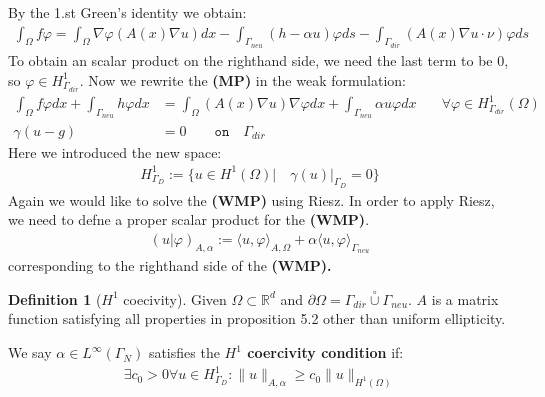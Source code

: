 \documentclass[a4paper,11pt,oneside,fleqn]{book}
\theoremstyle{definition}
\newtheorem{definition}{Definition}[section]
\theoremstyle{remark}
\begin{document}
By the 1.st Green's identity we obtain:
\begin{align*}
	\int_\Omega f\varphi = \int_\Omega \nabla \varphi( A(x)\nabla u )dx - \int_{\Gamma_{neu}} (h - \alpha u)\varphi ds - 
	\int_{\Gamma_{dir}} (A(x)\nabla u \cdot \nu)\varphi ds 
\end{align*}
To obtain an scalar product on the righthand side, we need the last term to be 0, so $\varphi \in H^1_{\Gamma_{dir}}$. Now we rewrite the \textbf{(MP)} in the weak formulation: 
\begin{equation}
\begin{aligned}
	\int_{\Omega}f\varphi dx + \int_{\Gamma_{neu}} h\varphi dx &= \int_\Omega(A(x) \nabla u)\nabla\varphi dx + \int_{\Gamma_{neu}} \alpha u \varphi dx
	\quad &\forall \varphi \in H^1_{\Gamma_{dir}}(\Omega)\\
	\gamma(u - g) &= 0 \qquad  \texttt{on} \quad \Gamma_{dir}
\end{aligned}
\end{equation}
Here we introduced the new space:
\begin{align*}
	H^1_{\Gamma_D}:= \{u \in H^1(\Omega) |\quad \gamma(u)|_{\Gamma_D} = 0\}
\end{align*}
Again we would like to solve the \textbf{(WMP) }using Riesz. In order to apply Riesz, we need to defne a proper scalar product for the \textbf{(WMP)}.
\begin{align*}
	( u| \varphi )_{A, \alpha}:= \langle u, \varphi \rangle_{A, \Omega} + \alpha \langle u, \varphi \rangle_{\Gamma_{neu}}
\end{align*}
corresponding to the righthand side of the \textbf{(WMP).}

\begin{definition}[$H^1$ coecivity]
Given $\Omega \subset \mathbb{R}^d$ and $\partial \Omega = \Gamma_{dir} \overset{\circ}{\cup} \Gamma_{neu}$. $A$ is a matrix function satisfying all properties in proposition 5.2 other than uniform ellipticity.\par 
We say $\alpha \in L^\infty(\Gamma_N)$ satisfies the \textbf{$H^1$ coercivity condition} if:
\begin{align*}
	\exists c_0 > 0 \forall u \in H^1_{\Gamma_D}: \|u\|_{A, \alpha} \geq c_0 \|u\|_{H^1(\Omega)}
\end{align*}
\end{definition}
\end{document}
